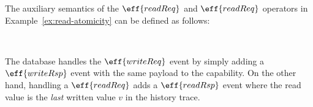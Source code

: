

\begin{example}\label{ex:aux-semantics}
The auxiliary semantics of the $\eff{readReq}$ and $\eff{readReq}$ operators in Example~\ref{ex:read-atomicity} can be defined as follows:

{\footnotesize
  \quad
  \\[0.1em]
  }\noindent

\noindent 
The database handles the $\eff{writeReq}$ event by simply adding a $\eff{writeRsp}$ event with the same payload to the capability. On the other hand, handling a $\eff{readReq}$ adds a $\eff{readRsp}$ event where the read value is the \emph{last} written value $v$ in the history trace.
\end{example}

